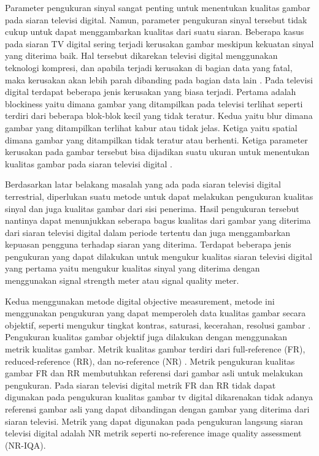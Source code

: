 Parameter pengukuran sinyal sangat penting untuk menentukan kualitas gambar pada siaran televisi digital. Namun, parameter pengukuran sinyal tersebut tidak cukup untuk dapat menggambarkan kualitas dari suatu siaran. Beberapa kasus pada siaran TV digital sering terjadi kerusakan gambar meskipun kekuatan sinyal yang diterima baik. Hal tersebut dikarekan televisi digital menggunakan teknologi kompresi, dan apabila terjadi kerusakan di bagian data yang fatal, maka kerusakan akan lebih parah dibanding pada bagian data lain \citep{Fischer2010}. Pada televisi digital terdapat beberapa jenis kerusakan yang biasa terjadi. Pertama adalah blockiness yaitu dimana gambar yang ditampilkan pada televisi terlihat seperti terdiri dari beberapa blok-blok kecil yang tidak teratur. Kedua yaitu blur dimana gambar yang ditampilkan terlihat kabur atau tidak jelas.  Ketiga yaitu spatial dimana gambar yang ditampilkan tidak teratur atau berhenti. Ketiga parameter kerusakan pada gambar tersebut bisa dijadikan suatu ukuran untuk menentukan kualitas gambar pada siaran televisi digital \citep{MichaelRobin2000}.

Berdasarkan latar belakang masalah yang ada pada siaran televisi digital terrestrial, diperlukan suatu metode untuk dapat melakukan pengukuran kualitas sinyal dan juga kualitas gambar dari sisi penerima. Hasil pengukuran tersebut nantinya dapat menunjukkan seberapa bagus kualitas dari gambar yang diterima dari siaran televisi digital dalam periode tertentu dan juga menggambarkan kepuasan pengguna terhadap siaran yang diterima. Terdapat beberapa jenis pengukuran yang dapat dilakukan untuk mengukur kualitas siaran televisi digital yang pertama yaitu mengukur kualitas sinyal yang diterima dengan menggunakan signal strength meter atau signal quality meter. 

Kedua menggunakan metode digital objective measurement, metode ini menggunakan pengukuran yang dapat memperoleh data kualitas gambar secara objektif, seperti mengukur tingkat kontras, saturasi, kecerahan, resolusi gambar \citep{Wang2003}. Pengukuran kualitas gambar objektif juga dilakukan dengan menggunakan metrik kualitas gambar. Metrik kualitas gambar terdiri dari full-reference (FR), reduced-reference (RR), dan no-reference (NR) \citep{Kusuma2005}. Metrik pengukuran kualitas gambar FR dan RR membutuhkan referensi dari gambar asli untuk melakukan pengukuran. Pada siaran televisi digital metrik FR dan RR tidak dapat digunakan pada pengukuran kualitas gambar tv digital dikarenakan tidak adanya referensi gambar asli yang dapat dibandingan dengan gambar yang diterima dari siaran televisi. Metrik yang dapat digunakan pada pengukuran langsung siaran televisi digital adalah NR metrik seperti no-reference image quality assessment (NR-IQA). 

